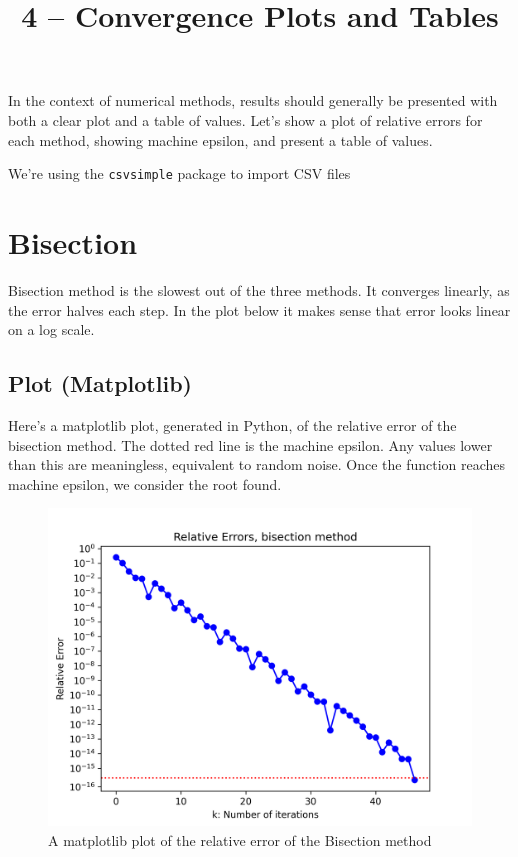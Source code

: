 \documentclass{article}
\title{4 -- Convergence Plots and Tables}
\begin{document}
\maketitle

In the context of numerical methods, results should generally be presented
with both a clear plot and a table of values. Let's show a plot of relative
errors for each method, showing machine epsilon, and present a table of values.

We're using the \texttt{csvsimple} package to import CSV files

\section{Bisection}

Bisection method is the slowest out of the three methods. It converges
linearly, as the error halves each step. In the plot below it makes sense
that error looks linear on a log scale.

\subsection{Plot (Matplotlib)}

Here's a matplotlib plot, generated in Python, of the relative error of the
bisection method. The dotted red line is the machine epsilon. Any values lower
than this are meaningless, equivalent to random noise. Once the function
reaches machine epsilon, we consider the root found.

\begin{figure}[h]
    \centering
    \includegraphics[scale=0.7]{./plots/bisectionrel.png}
    \caption {A matplotlib plot of the relative error of the Bisection method}
\end{figure}
\end{document}
